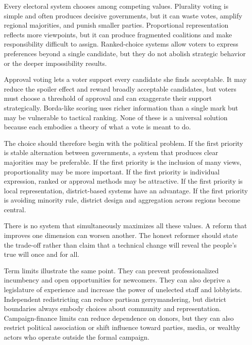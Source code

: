 ﻿\documentclass[12pt,a4paper]{book}
\begin{document}
Every electoral system chooses among competing values.  Plurality voting is
simple and often produces decisive governments, but it can waste votes,
amplify regional majorities, and punish smaller parties.  Proportional
representation reflects more viewpoints, but it can produce fragmented
coalitions and make responsibility difficult to assign.  Ranked-choice
systems allow voters to express preferences beyond a single candidate, but
they do not abolish strategic behavior or the deeper impossibility results.

Approval voting lets a voter support every candidate she finds acceptable.
It may reduce the spoiler effect and reward broadly acceptable candidates,
but voters must choose a threshold of approval and can exaggerate their
support strategically.  Borda-like scoring uses richer information than a
single mark but may be vulnerable to tactical ranking.  None of these is a
universal solution because each embodies a theory of what a vote is meant to
do.

The choice should therefore begin with the political problem.  If the first
priority is stable alternation between governments, a system that produces
clear majorities may be preferable.  If the first priority is the inclusion
of many views, proportionality may be more important.  If the first priority
is individual expression, ranked or approval methods may be attractive.  If
the first priority is local representation, district-based systems have an
advantage.  If the first priority is avoiding minority rule, district design
and aggregation across regions become central.

There is no system that simultaneously maximizes all these values.  A reform
that improves one dimension can worsen another.  The honest reformer should
state the trade-off rather than claim that a technical change will reveal
the people's true will once and for all.

Term limits illustrate the same point.  They can prevent professionalized
incumbency and open opportunities for newcomers.  They can also deprive a
legislature of experience and increase the power of unelected staff and
lobbyists.  Independent redistricting can reduce partisan gerrymandering,
but district boundaries always embody choices about community and
representation.  Campaign-finance limits can reduce dependence on donors,
but they can also restrict political association or shift influence toward
parties, media, or wealthy actors who operate outside the formal campaign.
\end{document}
